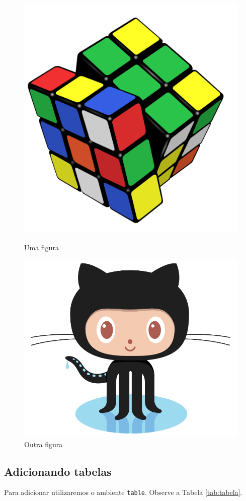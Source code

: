 \documentclass[11pt,a4paper]{article}
\begin{document}
\begin{figure}[!h]
  \centering
  \begin{minipage}[b]{0.4\textwidth}
  	\centering
    \includegraphics[width=.5\textwidth]{rubiks.png}   %
    \caption{Uma figura}
  \end{minipage}
  \begin{minipage}[b]{0.4\textwidth}
  	\centering
    \includegraphics[width=.5\textwidth]{logo.png}     %
    \caption{Outra figura}
  \end{minipage}
\end{figure}


\subsection{Adicionando tabelas}

Para adicionar utilizaremos o ambiente \texttt{table}. Observe a Tabela \ref{tab:tabela}.
\end{document}
